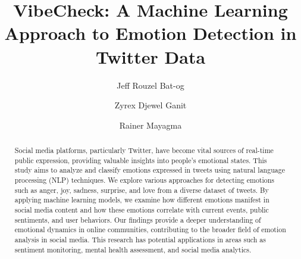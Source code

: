 
\title{VibeCheck: A Machine Learning Approach to Emotion Detection in Twitter Data}
\author{Jeff Rouzel Bat-og \and Zyrex Djewel Ganit \and Rainer Mayagma}

\maketitle


\begin{abstract}
	Social media platforms, particularly Twitter, have become vital sources of real-time public expression, providing valuable insights into people's emotional states. This study aims to analyze and classify emotions expressed in tweets using natural language processing (NLP) techniques. We explore various approaches for detecting emotions such as anger, joy, sadness, surprise, and love from a diverse dataset of tweets. By applying machine learning models, we examine how different emotions manifest in social media content and how these emotions correlate with current events, public sentiments, and user behaviors. Our findings provide a deeper understanding of emotional dynamics in online communities, contributing to the broader field of emotion analysis in social media. This research has potential applications in areas such as sentiment monitoring, mental health assessment, and social media analytics.
\end{abstract}


